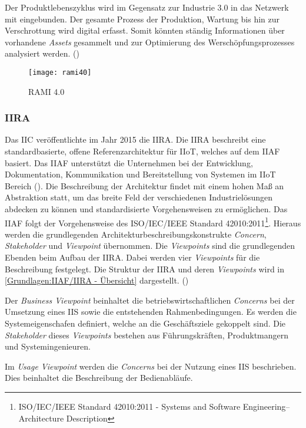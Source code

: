 Der Produktlebenszyklus wird im Gegensatz zur Industrie 3.0 in das Netzwerk mit eingebunden. Der gesamte Prozess der Produktion, Wartung bis hin zur Verschrottung wird digital erfasst. Somit könnten ständig Informationen über vorhandene \textit{Assets} gesammelt und zur Optimierung des Werschöpfungsprozesses analysiert werden. (\cite{RAMISpec})

\begin{figure}[h]
  \centering
  \texttt{[image: rami40]}
  \caption{RAMI 4.0}
  \label{Grundlagen:RAMI4.0-img}
\end{figure}

\subsubsection{IIRA}
\label{Grundlagen:IIRA}
Das \ac{IIC} veröffentlichte im Jahr 2015 die \ac{IIRA}. Die \ac{IIRA} beschreibt eine standardbasierte, offene Referenzarchitektur für \ac{IIoT}, welches auf dem \ac{IIAF} basiert. Das \ac{IIAF} unterstützt die Unternehmen bei der Entwicklung, Dokumentation, Kommunikation und Bereitstellung von Systemen im \ac{IIoT} Bereich (\cite{iira2017}). Die Beschreibung der Architektur findet mit einem hohen Maß an Abstraktion statt, um das breite Feld der verschiedenen Industrielösungen abdecken zu können und standardisierte Vorgehensweisen zu ermöglichen. Das \ac{IIAF} folgt der Vorgehensweise des ISO/IEC/IEEE Standard 42010:2011\footnote{ISO/IEC/IEEE Standard 42010:2011 - Systems and Software Engineering–Architecture Description}. Hieraus werden die grundlegenden Architekturbeschreibungskonstrukte \textit{Concern}, \textit{Stakeholder} und \textit{Viewpoint} übernommen. Die \textit{Viewpoints} sind die grundlegenden Ebenden beim Aufbau der \ac{IIRA}. Dabei werden vier \textit{Viewpoints} für die Beschreibung festgelegt. Die Struktur der \ac{IIRA} und deren \textit{Viewpoints} wird in \autoref{Grundlagen:IIAF/IIRA - Übersicht} dargestellt. (\cite{heidrich2016})

Der \textit{Business Viewpoint} beinhaltet die betriebswirtschaftlichen \textit{Concerns} bei der Umsetzung eines \ac{IIS} sowie die entstehenden Rahmenbedingungen. Es werden die Systemeigenschafen definiert, welche an die Geschäftsziele gekoppelt sind. Die \textit{Stakeholder} dieses \textit{Viewpoints} bestehen aus Führungskräften, Produktmangern und Systemingenieuren.

Im \textit{Usage Viewpoint} werden die \textit{Concerns} bei der Nutzung eines \ac{IIS} beschrieben. Dies beinhaltet die Beschreibung der Bedienabläufe.

